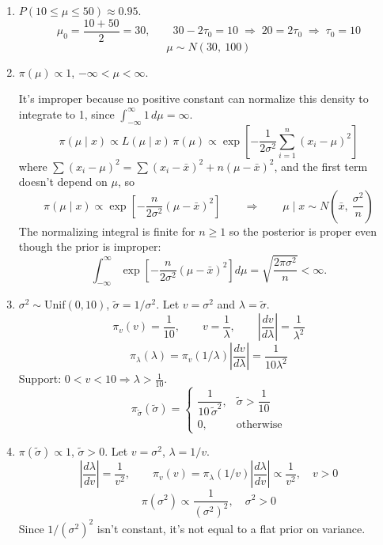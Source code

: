 \documentclass[11pt]{article}
\begin{document}
\begin{enumerate}
\item $P(10 \le \mu \le 50) \approx 0.95$.
\[
\mu_0 = \frac{10 + 50}{2} = \boxed{30}, \qquad 30 - 2\tau_0 = 10 \;\Rightarrow\; 20 = 2\tau_0 \;\Rightarrow\; \boxed{\tau_0 = 10}
\]
\[
\boxed{\mu \sim N(30,\ 100)}
\]

\item $\pi(\mu) \propto 1$, $-\infty < \mu < \infty$.

It's improper because no positive constant can normalize this density to integrate to 1, since $\int_{-\infty}^{\infty} 1\,d\mu = \infty$.
\[
\pi(\mu \mid x) \propto L(\mu \mid x)\,\pi(\mu) \propto \exp\left[-\frac{1}{2\sigma^2}\sum_{i=1}^n (x_i - \mu)^2\right]
\]
where $\sum (x_i - \mu)^2 = \sum (x_i - \bar{x})^2 + n(\mu - \bar{x})^2$, and the first term doesn't depend on $\mu$, so
\[
\pi(\mu \mid x) \propto \exp\left[-\frac{n}{2\sigma^2}(\mu - \bar{x})^2\right]
\qquad\Rightarrow\qquad
\boxed{\mu \mid x \sim N\left(\bar{x},\ \frac{\sigma^2}{n}\right)}
\]
The normalizing integral is finite for $n \ge 1$ so the posterior is proper even though the prior is improper:
\[
\int_{-\infty}^{\infty} \exp\left[-\frac{n}{2\sigma^2}(\mu - \bar{x})^2\right] d\mu = \sqrt{\frac{2\pi\sigma^2}{n}} < \infty.
\]

\item $\sigma^2 \sim \text{Unif}(0, 10)$, $\tilde{\sigma} = 1/\sigma^2$. Let $v = \sigma^2$ and $\lambda = \tilde{\sigma}$.
\[
\pi_v(v) = \frac{1}{10}, \qquad v = \frac{1}{\lambda}, \qquad \left|\frac{dv}{d\lambda}\right| = \frac{1}{\lambda^2}
\]
\[
\pi_\lambda(\lambda) = \pi_v(1/\lambda)\left|\frac{dv}{d\lambda}\right| = \frac{1}{10\lambda^2}
\]
Support: $0 < v < 10 \Rightarrow \lambda > \frac{1}{10}$.
\[
\boxed{\pi_{\tilde\sigma}(\tilde\sigma) = \begin{cases} \dfrac{1}{10\,\tilde\sigma^2}, & \tilde\sigma > \dfrac{1}{10} \\[4pt] 0, & \text{otherwise} \end{cases}}
\]

\item $\pi(\tilde\sigma) \propto 1$, $\tilde\sigma > 0$. Let $v = \sigma^2$, $\lambda = 1/v$.
\[
\left|\frac{d\lambda}{dv}\right| = \frac{1}{v^2}, \qquad
\pi_v(v) = \pi_\lambda(1/v)\left|\frac{d\lambda}{dv}\right| \propto \frac{1}{v^2}, \quad v > 0
\]
\[
\boxed{\pi(\sigma^2) \propto \frac{1}{(\sigma^2)^2}, \quad \sigma^2 > 0}
\]
Since $1/(\sigma^2)^2$ isn't constant, it's not equal to a flat prior on variance.


\end{enumerate}
\end{document}
